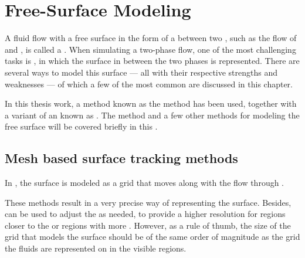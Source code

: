 \chapter{Free-Surface Modeling}
\label{chap:freesurfacemodeling}

A fluid flow with a free surface in the form of a  between two , such as the flow of \water and \air, is called a . When simulating a two-phase flow, one of the most challenging tasks is \FSM, in which the surface in between the two phases is represented. There are several ways to model this surface --- all with their respective strengths and weaknesses --- of which a few of the most common are discussed in this chapter.

In this thesis work, a method known as the \VOF method has been used, together with a variant of an  known as . The \VOF method and a few other methods for modeling the free surface will be covered briefly in this \levelname.



\section{Mesh based surface tracking methods}

In , the surface is modeled as a grid that moves along with the flow through .

These methods result in a very precise way of representing the surface. Besides,  can be used to adjust the  as needed, to provide a higher resolution for regions closer to the \camera or regions with more \turbulence. However, as a rule of thumb, the size of the grid that models the surface should be of the same order of magnitude as the grid the fluids are represented on in the visible regions.

